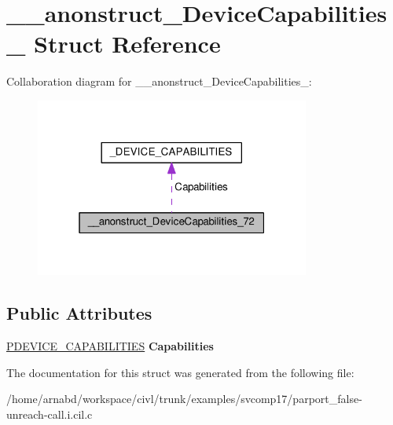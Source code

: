 \hypertarget{struct____anonstruct__DeviceCapabilities__72}{}\section{\+\_\+\+\_\+anonstruct\+\_\+\+Device\+Capabilities\+\_ Struct Reference}
\label{struct____anonstruct__DeviceCapabilities__72}


Collaboration diagram for \+\_\+\+\_\+anonstruct\+\_\+\+Device\+Capabilities\+\_\+:
\nopagebreak
\begin{figure}[H]
\begin{center}
\leavevmode
\includegraphics[width=256pt]{struct____anonstruct__DeviceCapabilities__72__coll__graph}
\end{center}
\end{figure}
\subsection*{Public Attributes}
\begin{DoxyCompactItemize}
\item 
\hypertarget{struct____anonstruct__DeviceCapabilities__72_a09517b61094b0d972ed15884fa5eb9d7}{}\hyperlink{struct__DEVICE__CAPABILITIES}{P\+D\+E\+V\+I\+C\+E\+\_\+\+C\+A\+P\+A\+B\+I\+L\+I\+T\+I\+E\+S} {\bfseries Capabilities}\label{struct____anonstruct__DeviceCapabilities__72_a09517b61094b0d972ed15884fa5eb9d7}

\end{DoxyCompactItemize}


The documentation for this struct was generated from the following file\+:\begin{DoxyCompactItemize}
\item 
/home/arnabd/workspace/civl/trunk/examples/svcomp17/parport\+\_\+false-\/unreach-\/call.\+i.\+cil.\+c\end{DoxyCompactItemize}
